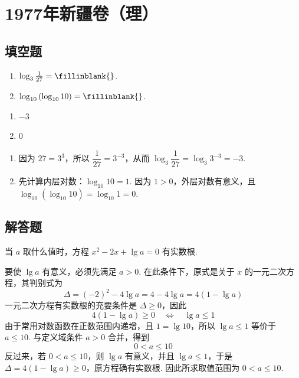 \chapter{1977年新疆卷（理）}

\section{填空题}

\begin{problem}
\begin{enumerate}
\item \( \log_3 \frac{1}{27}=\fillinblank{} \).
\item \( \log_{10}\left( \log_{10}10 \right)=\fillinblank{} \).
\end{enumerate}
\end{problem}

\begin{answer}
\begin{enumerate}
\item \(-3\)
\item \(0\)
\end{enumerate}
\end{answer}

\begin{solution}
\begin{enumerate}
\item 因为 \(27=3^3\)，所以 \(\dfrac{1}{27}=3^{-3}\)，从而
\(\log_3\dfrac{1}{27}=\log_3 3^{-3}=-3\).

\item 先计算内层对数：\(\log_{10}10=1\). 因为 \(1>0\)，外层对数有意义，且
\(\log_{10}\left(\log_{10}10\right)=\log_{10}1=0\).
\end{enumerate}
\end{solution}

\section{解答题}

\begin{problem}
当 \(a\) 取什么值时，方程 \(x^2-2x+\lg a=0\) 有实数根.
\end{problem}

\begin{solution}
要使 \(\lg a\) 有意义，必须先满足 \(a>0\). 在此条件下，原式是关于 \(x\) 的一元二次方程，其判别式为
\[
\Delta=(-2)^2-4\lg a=4-4\lg a=4\left(1-\lg a\right)
\]
一元二次方程有实数根的充要条件是 \(\Delta\geq0\)，因此
\[
4\left(1-\lg a\right)\geq0\quad\Longleftrightarrow\quad \lg a\leq1
\]
由于常用对数函数在正数范围内递增，且 \(1=\lg10\)，所以 \(\lg a\leq1\) 等价于 \(a\leq10\). 与定义域条件 \(a>0\) 合并，得到
\[
0<a\leq10
\]
反过来，若 \(0<a\leq10\)，则 \(\lg a\) 有意义，并且 \(\lg a\leq1\)，于是 \(\Delta=4(1-\lg a)\geq0\)，原方程确有实数根. 因此所求取值范围为 \(0<a\leq10\).
\end{solution}

